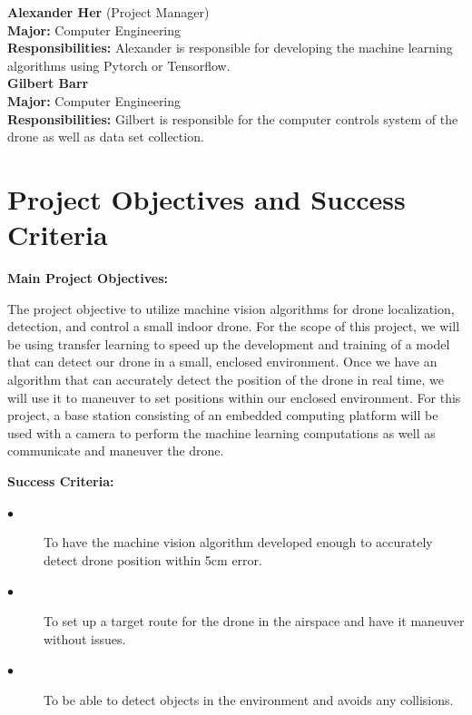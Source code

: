 \documentclass[12pt,onecolumn]{IEEEtran}			%
\begin{document}
\vspace{12pt} 


\textbf{Alexander Her} (Project Manager)\\ 
\textbf{Major:} Computer Engineering\\
\textbf{Responsibilities:} Alexander is responsible for developing the machine learning algorithms using Pytorch or Tensorflow. \\

\textbf{Gilbert Barr}\\
\textbf{Major:} Computer Engineering\\ 
\textbf{Responsibilities:} Gilbert is responsible for the computer controls system of the drone as well as data set collection. \\ 


 

 
 \section{Project Objectives and Success Criteria}
 
 \textbf{Main Project Objectives:}

    The project objective to utilize machine vision algorithms for drone localization, detection, and control a small indoor drone. For the scope of this project, we will be using transfer learning to speed up the development and training of a model that can detect our drone in a small, enclosed environment. Once we have an algorithm that can accurately detect the position of the drone in real time, we will use it to maneuver to set positions within our enclosed environment. For this project, a base station consisting of an embedded computing platform will be used with a camera to perform the machine learning computations as well as communicate and maneuver the drone.
  
\vspace{12pt} 

 \textbf{Success Criteria:}

 \begin{description}
  \item[$\bullet$ ] To have the machine vision algorithm developed enough to accurately detect drone position within 5cm error. 
  \item[$\bullet$ ] To set up a target route for the drone in the airspace and have it maneuver without issues. 
  \item[$\bullet$ ] To be able to detect objects in the environment and avoids any collisions. 
\end{description} 
\vspace{12pt} 
\end{document}

